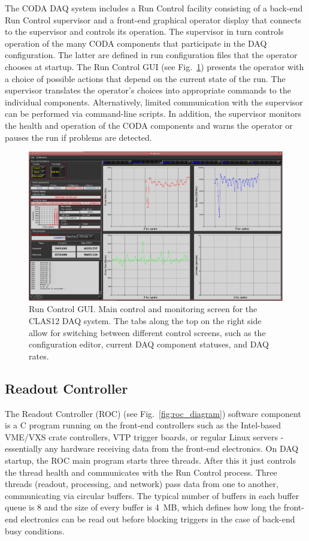 The CODA DAQ system includes a Run Control facility consisting of a back-end Run Control supervisor and a front-end
graphical operator display that connects to the supervisor and controls its operation. The supervisor in turn controls
operation of the many CODA components that participate in the DAQ configuration. The latter are defined in run
configuration files that the operator chooses at startup. The Run Control GUI (see Fig.~\ref{fig:runcontrol1}) presents
the operator with a choice of possible actions that depend on the current state of the run. The supervisor translates the
operator's choices into appropriate commands to the individual components. Alternatively, limited communication with the
supervisor can be performed via command-line scripts. In addition, the supervisor monitors the health and operation of
the CODA components and warns the operator or pauses the run if problems are detected.

\begin{figure}[hbt]
	\centering
	\includegraphics[width=1.0\columnwidth,keepaspectratio]{img/runcontrol1.png}
	\caption{Run Control GUI. Main control and monitoring screen for the CLAS12 DAQ system. The tabs along the top
          on the right side allow for switching between different control screens, such as the configuration editor, current
          DAQ component statuses, and DAQ rates.}
	\label{fig:runcontrol1}
\end{figure}



\subsection{Readout Controller}

The Readout Controller (ROC) (see Fig.~\ref{fig:roc_diagram}) software component is a C program running on the
front-end controllers such as the Intel-based VME/VXS crate controllers, VTP trigger boards, or regular Linux servers -
essentially any hardware receiving data from the front-end electronics. On DAQ startup, the ROC main program starts
three threads. After this it just controls the thread health and communicates with the Run Control process. Three threads
(readout, processing, and network) pass data from one to another, communicating via circular buffers. The typical number
of buffers in each buffer queue is 8 and the size of every buffer is 4~MB, which defines how long the front-end electronics
can be read out before blocking triggers in the case of back-end busy conditions.

